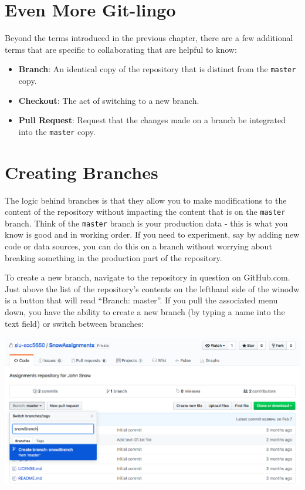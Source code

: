 \documentclass[]{book}
\providecommand{\tightlist}{%
  \setlength{\itemsep}{0pt}\setlength{\parskip}{0pt}}
\theoremstyle{definition}
\theoremstyle{definition}
\theoremstyle{definition}
\theoremstyle{remark}
\begin{document}
\section{Even More Git-lingo}\label{even-more-git-lingo}

Beyond the terms introduced in the previous chapter, there are a few
additional terms that are specific to collaborating that are helpful to
know:

\begin{itemize}
\tightlist
\item
  \textbf{Branch}: An identical copy of the repository that is distinct
  from the \texttt{master} copy.
\item
  \textbf{Checkout}: The act of switching to a new branch.
\item
  \textbf{Pull Request}: Request that the changes made on a branch be
  integrated into the \texttt{master} copy.
\end{itemize}

\section{Creating Branches}\label{creating-branches}

The logic behind branches is that they allow you to make modifications
to the content of the repository without impacting the content that is
on the \texttt{master} branch. Think of the \texttt{master} branch is
your production data - this is what you know is good and in working
order. If you need to experiment, say by adding new code or data
sources, you can do this on a branch without worrying about breaking
something in the production part of the repository.

To create a new branch, navigate to the repository in question on
GitHub.com. Just above the list of the repository's contents on the
lefthand side of the winodw is a button that will read ``Branch:
master''. If you pull the associated menu down, you have the ability to
create a new branch (by typing a name into the text field) or switch
between branches:

\includegraphics[width=1\linewidth]{images/branch1}
\end{document}
